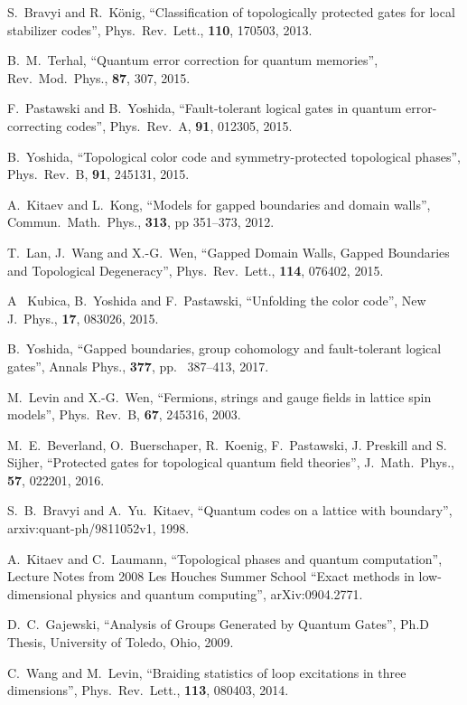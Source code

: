 \documentclass[pra,twocolumn,a4paper,nofootinbib]{revtex4-1}
\begin{document}
\begin{thebibliography}{99}
S.~Bravyi and R.~K{\"o}nig, ``Classification of topologically protected gates for local stabilizer codes'',  Phys.~Rev.~Lett., \textbf{110}, 170503, 2013.

B.~M.~Terhal, ``Quantum error correction for quantum memories'', Rev.~Mod.~Phys., \textbf{87}, 307, 2015.

F.~Pastawski and B.~Yoshida, ``Fault-tolerant logical gates in quantum error-correcting codes'', Phys.~Rev.~A, \textbf{91}, 012305, 2015.

B.~Yoshida, ``Topological color code and symmetry-protected topological phases'',  Phys.~Rev.~B, \textbf{91}, 245131, 2015.

A.~Kitaev and L.~Kong, ``Models for gapped boundaries and domain walls'', Commun.~Math.~Phys., \textbf{313}, pp 351--373, 2012.

T.~Lan, J.~Wang and X.-G.~Wen, ``Gapped  Domain Walls, Gapped Boundaries and Topological Degeneracy'',  Phys.~Rev.~Lett., \textbf{114}, 076402, 2015.

A~ Kubica, B.~Yoshida and F.~Pastawski, ``Unfolding the color code'', New J.~Phys., \textbf{17}, 083026, 2015.

B.~Yoshida, ``Gapped boundaries, group cohomology and fault-tolerant logical gates'',  Annals Phys., \textbf{377}, pp.~ 387--413, 2017.  

M.~Levin and X.-G.~Wen, ``Fermions, strings and gauge fields in lattice spin models'', Phys.~Rev.~B,  \textbf{67}, 245316, 2003.

M.~E.~Beverland, O.~Buerschaper, R.~Koenig, F.~Pastawski, J. Preskill and S. Sijher, ``Protected gates for topological quantum field theories'', J.~Math.~Phys., \textbf{57}, 022201, 2016.

S.~B.~Bravyi and A.~Yu.~Kitaev, ``Quantum codes on a lattice with boundary'', arxiv:quant-ph/9811052v1, 1998.

A.~Kitaev and C.~Laumann, ``Topological phases and quantum computation'', Lecture Notes from 2008 Les Houches Summer School ``Exact methods in low-dimensional physics and quantum computing'', arXiv:0904.2771.

D.~C.~Gajewski, ``Analysis of Groups Generated by Quantum Gates'', Ph.D Thesis, University of Toledo, Ohio, 2009.

C.~Wang and M.~Levin, ``Braiding statistics of loop excitations in three dimensions'', Phys.~Rev.~Lett., \textbf{113}, 080403, 2014.


\end{thebibliography}
\end{document}

